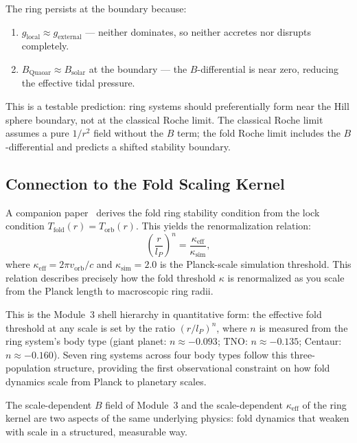 \documentclass[12pt]{article}
\begin{document}
The ring persists at the boundary because:
\begin{enumerate}
  \item $g_{\mathrm{local}} \approx g_{\mathrm{external}}$ --- neither
        dominates, so neither accretes nor disrupts completely.
  \item $B_{\mathrm{Quaoar}} \approx B_{\mathrm{solar}}$ at the boundary
        --- the $B$-differential is near zero, reducing the effective
        tidal pressure.
\end{enumerate}
This is a testable prediction: ring systems should preferentially form
near the Hill sphere boundary, not at the classical Roche limit.
The classical Roche limit assumes a pure $1/r^2$ field without the
$B$ term; the fold Roche limit includes the $B$-differential and
predicts a shifted stability boundary.

\subsection{Connection to the Fold Scaling Kernel}

A companion paper~\cite{quaoar} derives the fold ring stability
condition from the lock condition $T_{\mathrm{fold}}(r) =
T_{\mathrm{orb}}(r)$. This yields the renormalization relation:
\begin{equation}
  \left(\frac{r}{l_P}\right)^n = \frac{\kappa_{\mathrm{eff}}}{\kappa_{\mathrm{sim}}},
  \label{eq:kernel_mod3}
\end{equation}
where $\kappa_{\mathrm{eff}} = 2\pi v_{\mathrm{orb}}/c$ and
$\kappa_{\mathrm{sim}} = 2.0$ is the Planck-scale simulation threshold.
This relation describes precisely how the fold threshold $\kappa$
is renormalized as you scale from the Planck length to macroscopic
ring radii.

This is the Module~3 shell hierarchy in quantitative form:
the effective fold threshold at any scale is set by the ratio
$(r/l_P)^n$, where $n$ is measured from the ring system's
body type (giant planet: $n \approx -0.093$; TNO: $n \approx -0.135$;
Centaur: $n \approx -0.160$).
Seven ring systems across four body types follow this three-population
structure, providing the first observational constraint on how fold
dynamics scale from Planck to planetary scales.

The scale-dependent $B$ field of Module~3 and the scale-dependent
$\kappa_{\mathrm{eff}}$ of the ring kernel are two aspects of the
same underlying physics: fold dynamics that weaken with scale in a
structured, measurable way.
\end{document}

